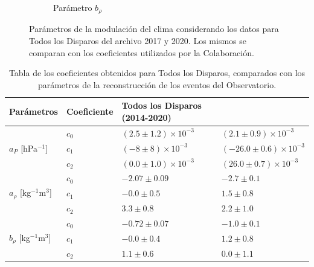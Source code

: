 \begin{figure}[H]
\begin{subfigure}[b]{\textwidth}
  \caption{Parámetro  $b_\rho$   }
  \end{subfigure}
  \caption{Parámetros de la modulación del clima considerando los datos para Todos los Disparos del archivo 2017 y 2020. Los mismos se comparan con los coeficientes utilizados por la Colaboración.}
  \label{fig:ALL-params}
\end{figure}

\begin{table}[H]
  \centering
  \begin{tabular}{l|l|l|l}
       Parámetros									& Coeficiente		& Todos los Disparos (2014-2020)	                  & \cite{aab2017impact}	\\ \hline \hline
   \multirow{3}{*}{$a_P$ [hPa$^{-1}$]}  			    &  $c_0$			& $( 2.5\pm 1.2)\times 10^{-3}$	& $( 2.1 \pm 0.9)\times 10^{-3} $	\\ \cline{2-4} %
                                                  &  $c_1$			& $(-8 \pm 8)\times 10^{-3}$	& $(-26.0 \pm 0.6 )\times 10^{-3}$	\\ \cline{2-4} 
                                                  &  $c_2$			& $( 0.0\pm 1.0)\times 10^{-3}$	& $( 26.0 \pm 0.7 )\times 10^{-3}$	\\ \hline \hline%
  
   \multirow{3}{*}{$a_\rho$ [kg$^{-1}$m$^3$]}  	  &  $c_0$			& $-2.07   \pm 0.09$	            & $ -2.7  \pm 0.1  $\\ \cline{2-4} 
                                                  &  $c_1$			& $-0.0    \pm 0.5 $	            & $ 1.5   \pm 0.8  $\\ \cline{2-4} 
                                                  &  $c_2$			& $ 3.3    \pm 0.8 $	            & $ 2.2   \pm 1.0  $\\ \hline \hline%
  
  \multirow{3}{*}{$b_\rho$ [kg$^{-1}$m$^3$]} 		  &  $c_0$			& $-0.72   \pm 0.07$		            & $-1.0   \pm 0.1 $	\\ \cline{2-4} 
                                                  &  $c_1$			& $-0.0    \pm 0.4$		            & $ 1.2   \pm 0.8  $	\\ \cline{2-4} 
                                                  &  $c_2$			& $ 1.1    \pm 0.6$		            & $ 0.0   \pm 1.1  $	\\ 
  
  \end{tabular}	
  \caption{Tabla de los coeficientes obtenidos para Todos los Disparos, comparados con los parámetros de la reconstrucción de los eventos del Observatorio.} \label{tabla:cuadratica_ALL}
\end{table}


